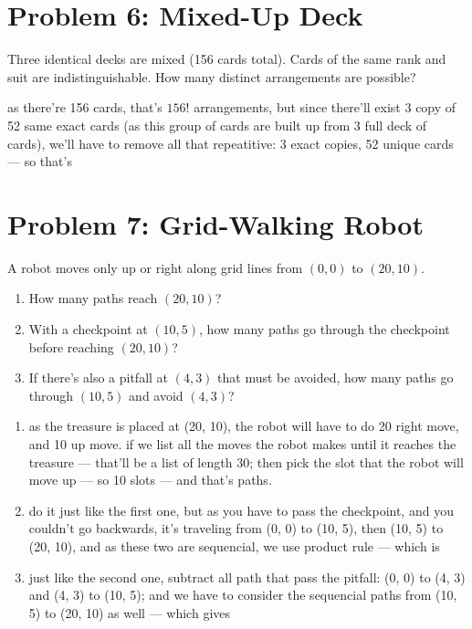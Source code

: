 \vspace{1em}
\hrulefill

\section*{Problem 6: Mixed-Up Deck}
Three identical decks are mixed (156 cards total). Cards of the same rank and suit are indistinguishable. How many distinct arrangements are possible?

\medskip
\solution

as there're 156 cards, that's $156!$ arrangements, but since there'll exist 3 copy of 52 same exact cards (as this group of cards are built up from 3 full deck of cards), we'll have to remove all that repeatitive: 3 exact copies, 52 unique cards --- so that's 

\vspace{1em}
\hrulefill

\section*{Problem 7: Grid-Walking Robot}
A robot moves only up or right along grid lines from $(0,0)$ to $(20,10)$.
\begin{enumerate}[label=\arabic*.]
    \item How many paths reach $(20,10)$?
    \item With a checkpoint at $(10,5)$, how many paths go through the checkpoint before reaching $(20,10)$?
    \item If there's also a pitfall at $(4,3)$ that must be avoided, how many paths go through $(10,5)$ and avoid $(4,3)$?
\end{enumerate}

\medskip
\solution

\begin{enumerate}
    \item as the treasure is placed at (20, 10), the robot will have to do 20 right move, and 10 up move. if we list all the moves the robot makes until it reaches the treasure --- that'll be a list of length 30; then pick the slot that the robot will move up --- so 10 slots --- and that's   paths.
    \item do it just like the first one, but as you have to pass the checkpoint, and you couldn't go backwards, it's traveling from (0, 0) to (10, 5), then (10, 5) to (20, 10), and as these two are sequencial, we use product rule --- which is 
    \item just like the second one, subtract all path that pass the pitfall: (0, 0) to (4, 3) and (4, 3) to (10, 5); and we have to consider the sequencial paths from (10, 5) to (20, 10) as well --- which gives 
\end{enumerate}


